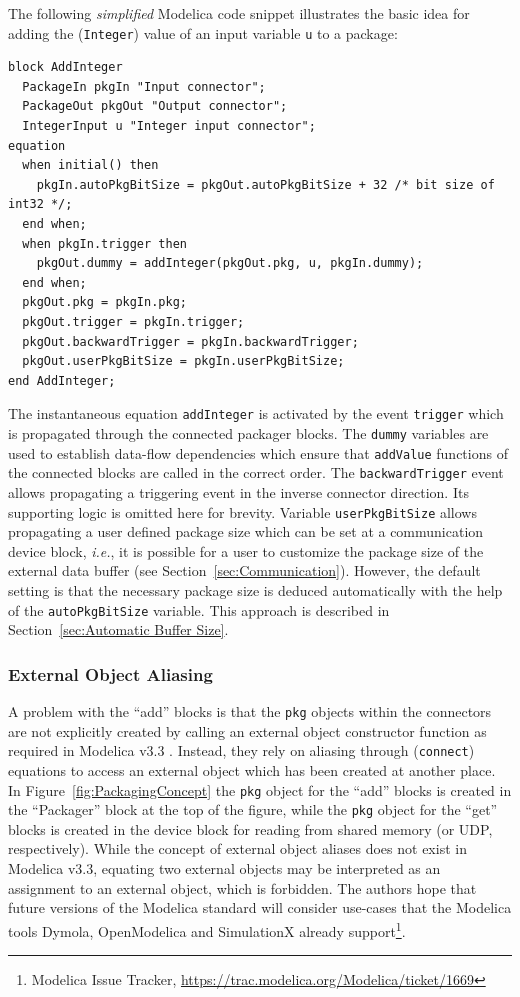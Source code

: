 \documentclass{resources/modelica}
\newcommand{\modelica}[1]{\lstinline[language=modelica]|#1|}
\begin{document}
The
following \emph{simplified} Modelica code snippet illustrates the basic idea for
adding the (\modelica{Integer}) value of an input variable \modelica{u} to a package:
\begin{lstlisting}[language=modelica]
block AddInteger
  PackageIn pkgIn "Input connector";
  PackageOut pkgOut "Output connector";
  IntegerInput u "Integer input connector";
equation
  when initial() then
    pkgIn.autoPkgBitSize = pkgOut.autoPkgBitSize + 32 /* bit size of int32 */;
  end when;
  when pkgIn.trigger then
    pkgOut.dummy = addInteger(pkgOut.pkg, u, pkgIn.dummy);
  end when;
  pkgOut.pkg = pkgIn.pkg;
  pkgOut.trigger = pkgIn.trigger;
  pkgOut.backwardTrigger = pkgIn.backwardTrigger;
  pkgOut.userPkgBitSize = pkgIn.userPkgBitSize;
end AddInteger;
\end{lstlisting}
The instantaneous equation \modelica{addInteger} is activated by the event
\modelica{trigger} which is propagated through the connected packager blocks.
The \modelica{dummy} variables are used to establish data-flow dependencies
which ensure that \modelica{addValue} functions of the connected
blocks are called in the correct order. The \modelica{backwardTrigger} event
allows propagating a triggering event in the inverse connector direction.
Its supporting logic is omitted here for brevity. Variable
\modelica{userPkgBitSize} allows propagating a user defined package size which
can be set at a communication device block, \textit{i.e.}, it is possible for a
user to customize the package size of the external data buffer (see
Section~\ref{sec:Communication}). However,
the default setting is that the necessary package size is deduced automatically
with the help of the \modelica{autoPkgBitSize} variable. This approach is
described in Section~\ref{sec:Automatic Buffer Size}.

\subsubsection{External Object Aliasing}
\label{sec:External Object Aliasing}

A problem with the ``add'' blocks is that the \modelica{pkg}
objects within the connectors are not explicitly created by calling an external object constructor
function as required in Modelica v3.3 \cite[p.\@~165]{ModelicaAssociation2014}.
Instead, they rely on aliasing through (\modelica{connect}) equations to
access an external object which has been created at another place. In
Figure~\ref{fig:PackagingConcept} the \modelica{pkg} object for the ``add''
blocks is created in the ``Packager'' block at the top of the figure, while the
\modelica{pkg} object for the ``get'' blocks is created in the device block for reading from
shared memory (or UDP, respectively). While the concept of external object
aliases does not exist in Modelica v3.3, equating two external
objects may be interpreted as an assignment to an external object,
which is forbidden. The authors hope that future versions of
the Modelica standard will consider use-cases that the
Modelica tools Dymola, OpenModelica and SimulationX already support\footnote{Modelica Issue Tracker,
\url{https://trac.modelica.org/Modelica/ticket/1669}}.
\end{document}
